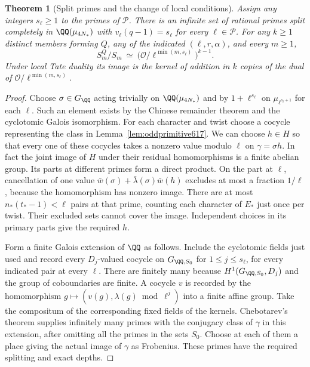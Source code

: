 \documentclass[a4paper,11pt]{article}
\newtheorem{theorem}[proposition]{Theorem}
\theoremstyle{definition}
\theoremstyle{remark}
\numberwithin{equation}{section}
\newcommand{\OO}{\mathcal O}
\begin{document}
\begin{theorem}[Split primes and the change of local conditions]
\label{thm:matchingprimes617}
Assign any integers \(s_\ell\ge1\) to the primes of \(\mathcal P\).
There is an infinite set of rational primes split completely in
\(\QQ(\mu_{4N_*})\) with \(v_\ell(q-1)=s_\ell\) for every
\(\ell\in\mathcal P\). For any \(k\ge1\) distinct members forming
\(Q\), any of the indicated \((\ell,r,\alpha)\), and every \(m\ge1\),
\[
               S_m^Q/S_m
      \ \simeq\ \big(\OO/\ell^{\min(m,s_\ell)}\big)^{k-1}.
      \tag{\(\ast\)}
\]
Under local Tate duality its image is the kernel of addition in \(k\)
copies of the dual of \(\OO/\ell^{\min(m,s_\ell)}\).
\end{theorem}
\begin{proof}
Choose \(\sigma\in G_\QQ\) acting trivially on
\(\QQ(\mu_{4N_*})\) and by \(1+\ell^{s_\ell}\) on
\(\mu_{\ell^{s_\ell+1}}\) for each \(\ell\). Such an element exists by
the Chinese remainder theorem and the cyclotomic Galois isomorphism.
For each character and twist choose a cocycle representing the class
in Lemma~\ref{lem:oddprimitive617}. We can choose \(h\in H\) so
that every one of these cocycles takes a nonzero value modulo
\(\ell\) on \(\gamma=\sigma h\).
In fact the joint image of \(H\) under their residual homomorphisms
is a finite abelian group. Its parts at different primes form a
direct product. On the part at \(\ell\), cancellation of one value
\(\bar w(\sigma)+\bar\lambda(\sigma)\bar w(h)\) excludes at most a
fraction \(1/\ell\), because the homomorphism has nonzero image.
There are at most \(n_*(t_*-1)<\ell\) pairs at that prime, counting
each character of \(E_*\) just once per twist. Their excluded sets
cannot cover the image. Independent choices in its primary parts
give the required \(h\).

Form a finite Galois extension of \(\QQ\) as follows. Include the
cyclotomic fields just used and record every \(D_j\)-valued cocycle
on \(G_{\QQ,S_0}\) for \(1\le j\le s_\ell\), for every indicated
pair at every \(\ell\). There are finitely many because
\(H^1(G_{\QQ,S_0},D_j)\) and the group of coboundaries are finite.
A cocycle \(v\) is recorded by the homomorphism
\(g\mapsto(v(g),\lambda(g)\bmod\ell^j)\) into a finite affine group.
Take the compositum of the corresponding fixed fields of the kernels.
Chebotarev's theorem supplies infinitely many primes with the
conjugacy class of \(\gamma\) in this extension, after omitting all
the primes in the sets \(S_0\). Choose at each of them a place
giving the actual image of \(\gamma\) as Frobenius. These primes
have the required splitting and exact depths.


\end{proof}
\end{document}
